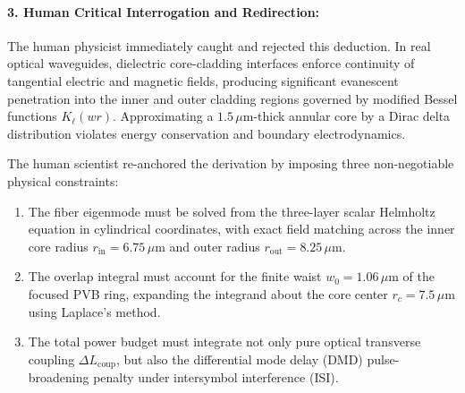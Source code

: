 \documentclass[11pt,a4paper]{article}
\begin{document}
\paragraph{3. Human Critical Interrogation and Redirection:}
The human physicist immediately caught and rejected this deduction. In real optical waveguides, dielectric core-cladding interfaces enforce continuity of tangential electric and magnetic fields, producing significant evanescent penetration into the inner and outer cladding regions governed by modified Bessel functions $K_\ell(w r)$. Approximating a $1.5\,\mu\text{m}$-thick annular core by a Dirac delta distribution violates energy conservation and boundary electrodynamics.

The human scientist re-anchored the derivation by imposing three non-negotiable physical constraints:
\begin{enumerate}
    \item The fiber eigenmode must be solved from the three-layer scalar Helmholtz equation in cylindrical coordinates, with exact field matching across the inner core radius $r_{\text{in}} = 6.75\,\mu\text{m}$ and outer radius $r_{\text{out}} = 8.25\,\mu\text{m}$.
    \item The overlap integral must account for the finite waist $w_0 = 1.06\,\mu\text{m}$ of the focused PVB ring, expanding the integrand about the core center $r_c = 7.5\,\mu\text{m}$ using Laplace's method.
    \item The total power budget must integrate not only pure optical transverse coupling $\Delta L_{\text{coup}}$, but also the differential mode delay (DMD) pulse-broadening penalty under intersymbol interference (ISI).
\end{enumerate}
\end{document}
